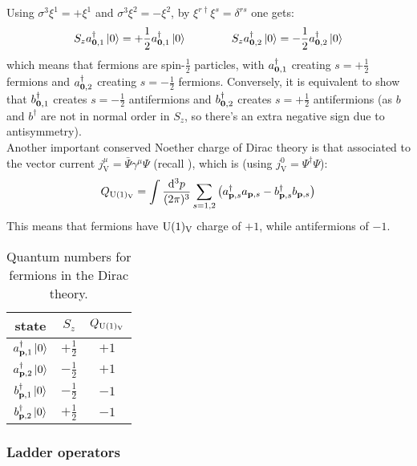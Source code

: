 Using $ \sigma^3 \xi^1 = + \xi^1 $ and $ \sigma^3 \xi^2 = - \xi^2 $, by $ \xi^{r\dagger} \xi^s = \delta^{rs} $ one gets:
\begin{equation*}
  S_z a_{\mathbf{0},1}^\dagger \ket{0} = +\frac{1}{2} a_{\mathbf{0},1}^\dagger \ket{0}
  \qquad \qquad
  S_z a_{\mathbf{0},2}^\dagger \ket{0} = -\frac{1}{2} a_{\mathbf{0},2}^\dagger \ket{0}
\end{equation*}
which means that fermions are spin-$ \frac{1}{2} $ particles, with $ a_{\mathbf{0},1}^\dagger $ creating $ s = +\frac{1}{2} $ fermions and $ a_{\mathbf{0},2}^\dagger $ creating $ s = -\frac{1}{2} $ fermions. Conversely, it is equivalent to show that $ b_{\mathbf{0},1}^\dagger $ creates $ s = -\frac{1}{2} $ antifermions and $ b_{\mathbf{0},2}^\dagger $ creates $ s = +\frac{1}{2} $ antifermions (as $ b $ and $ b^\dagger $ are not in normal order in $ S_z $, so there's an extra negative sign due to antisymmetry).\\
Another important conserved Noether charge of Dirac theory is that associated to the vector current $ j^\mu_\text{V} = \bar{\Psi} \gamma^\mu \Psi $ (recall ), which is (using $ j^0_\text{V} = \Psi^\dagger \Psi $):
\begin{equation}
  Q_{\mathrm{U}(1)_\text{V}} = \int \frac{\mathrm{d}^3p}{(2\pi)^3} \sum_{s = 1,2} \left( a_{\mathbf{p},s}^\dagger a_{\mathbf{p},s} - b_{\mathbf{p},s}^\dagger b_{\mathbf{p},s} \right)
\end{equation}
This means that fermions have $ \mathrm{U}(1)_\text{V} $ charge of $ +1 $, while antifermions of $ -1 $.

\begin{table}[h!]
  \centering
  \begin{tabular}{ccc}
    \hline
    state & $ S_z $ & $ Q_{\mathrm{U}(1)_\text{V}} $ \\
    \hline
    \rule{0pt}{3ex} $ a_{\mathbf{p},1}^\dagger \ket{0} $ & $ +\tfrac{1}{2} $ & $ +1 $ \\
    \rule{0pt}{3ex} $ a_{\mathbf{p},2}^\dagger \ket{0} $ & $ -\tfrac{1}{2} $ & $ +1 $ \\
    \rule{0pt}{3ex} $ b_{\mathbf{p},1}^\dagger \ket{0} $ & $ -\tfrac{1}{2} $ & $ -1 $ \\
    \rule{0pt}{3ex} $ b_{\mathbf{p},2}^\dagger \ket{0} $ & $ +\tfrac{1}{2} $ & $ -1 $ \\
  \end{tabular}
  \caption{Quantum numbers for fermions in the Dirac theory.}
  \label{tab:dirac-qn}
\end{table}

\subsubsection{Ladder operators}


